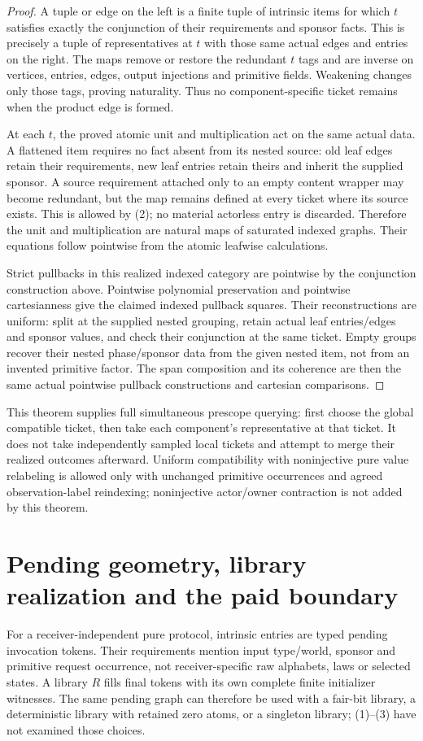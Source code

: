 \documentclass[11pt]{article}
\begin{document}
\begin{proof}
A tuple or edge on the left is a finite tuple of intrinsic items for which $t$ satisfies exactly the conjunction of their requirements and sponsor facts. This is precisely a tuple of representatives at $t$ with those same actual edges and entries on the right. The maps remove or restore the redundant $t$ tags and are inverse on vertices, entries, edges, output injections and primitive fields. Weakening changes only those tags, proving naturality. Thus no component-specific ticket remains when the product edge is formed.

At each $t$, the proved atomic unit and multiplication act on the same actual data. A flattened item requires no fact absent from its nested source: old leaf edges retain their requirements, new leaf entries retain theirs and inherit the supplied sponsor. A source requirement attached only to an empty content wrapper may become redundant, but the map remains defined at every ticket where its source exists. This is allowed by (2); no material actorless entry is discarded. Therefore the unit and multiplication are natural maps of saturated indexed graphs. Their equations follow pointwise from the atomic leafwise calculations.

Strict pullbacks in this realized indexed category are pointwise by the conjunction construction above. Pointwise polynomial preservation and pointwise cartesianness give the claimed indexed pullback squares. Their reconstructions are uniform: split at the supplied nested grouping, retain actual leaf entries/edges and sponsor values, and check their conjunction at the same ticket. Empty groups recover their nested phase/sponsor data from the given nested item, not from an invented primitive factor. The span composition and its coherence are then the same actual pointwise pullback constructions and cartesian comparisons.\end{proof}

This theorem supplies full simultaneous prescope querying: first choose the global compatible ticket, then take each component's representative at that ticket. It does not take independently sampled local tickets and attempt to merge their realized outcomes afterward. Uniform compatibility with noninjective pure value relabeling is allowed only with unchanged primitive occurrences and agreed observation-label reindexing; noninjective actor/owner contraction is not added by this theorem.

\section{Pending geometry, library realization and the paid boundary}
For a receiver-independent pure protocol, intrinsic entries are typed pending invocation tokens. Their requirements mention input type/world, sponsor and primitive request occurrence, not receiver-specific raw alphabets, laws or selected states. A library $R$ fills final tokens with its own complete finite initializer witnesses. The same pending graph can therefore be used with a fair-bit library, a deterministic library with retained zero atoms, or a singleton library; (1)--(3) have not examined those choices.
\end{document}

